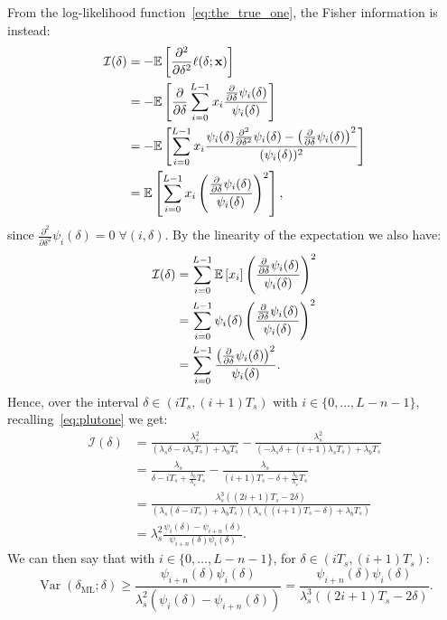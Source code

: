\noindent
From the log-likelihood function~\eqref{eq:the_true_one}, the Fisher information is instead:
\begin{equation}
\begin{aligned}
\mathcal{I}(\delta)
& =-\mathbb{E}\left[{\frac{\partial^2}{\partial \delta^2} \ell(\delta ; \mathbf{x})}\right]\\
& =-\mathbb{E}\left[{\frac{\partial}{\partial \delta} \sum_{i=0}^{L-1} x_i\frac{ \frac{\partial}{\partial \delta}\psi_i(\delta)}{\psi_i(\delta)}}\right]\\
& =-\mathbb{E}\left[{ \sum_{i=0}^{L-1} x_i
\frac{ \psi_i(\delta)\frac{\partial^2}{\partial \delta^2}\psi_i(\delta)
-\left(\frac{\partial}{\partial \delta}\psi_i(\delta)\right)^2}
{(\psi_i(\delta))^2}}\right]\\
& =\mathbb{E}\left[{ \sum_{i=0}^{L-1} x_i
\left(
\frac{\frac{\partial}{\partial \delta}\psi_i(\delta)}{\psi_i(\delta)}
\right)^2}\right],
\end{aligned}
\end{equation}
since \(\frac{\partial^2}{\partial \delta^2}\psi_i(\delta)=0 \;\forall (i,\delta)\). By the linearity of the expectation we also have:
\begin{equation}
\begin{aligned}
\mathcal{I}(\delta)
& = \sum_{i=0}^{L-1} \mathbb{E}\left[{x_i}\right]
\left(
\frac{\frac{\partial}{\partial \delta}\psi_i(\delta)}{\psi_i(\delta)}
\right)^2\\
& = \sum_{i=0}^{L-1} \psi_i(\delta)
\left(
\frac{\frac{\partial}{\partial \delta}\psi_i(\delta)}{\psi_i(\delta)}
\right)^2\\
& = \sum_{i=0}^{L-1}
\frac{\left(\frac{\partial}{\partial \delta}\psi_i(\delta)\right)^2}{\psi_i(\delta)}.
\end{aligned}
\end{equation}
Hence, over the interval \(\delta \in(iT_s,(i+1)T_s)\) with \(i\in\{0, \ldots, L-n-1\}\), recalling~\eqref{eq:plutone} we get:
\begin{equation}
\begin{aligned}
\mathcal{I}(\delta)
&= \frac{\lambda_s^2}{\left(\lambda_s \delta-i \lambda_s T_s\right)+\lambda_b T_s}
-\frac{\lambda_s^2}{\left(-\lambda_s \delta+(i+1) \lambda_s T_s\right)+\lambda_b T_s} \\
&= \frac{\lambda_s}{\delta-i  T_s+\frac{\lambda_b}{\lambda_s} T_s}
- \frac{\lambda_s}{(i+1)T_s-\delta+\frac{\lambda_b}{\lambda_s} T_s}\\
&=\frac{\lambda_s^3\left((2 i+1) T_s-2 \delta\right)}{\left(\lambda_s\left(\delta-i T_s\right)+\lambda_b T_s\right)\left(\lambda_s\left((i+1) T_s-\delta\right)+\lambda_b T_s\right)}\\
&=\lambda_s^2 \frac{\psi_i(\delta)-\psi_{i+n}(\delta)}{\psi_{i+n}(\delta) \psi_i(\delta)}.
\end{aligned}
\label{eq:fisherone}
\end{equation} 
We can then say that with \(i\in\{0, \ldots, L-n-1\}\), for \(\delta \in(iT_s,(i+1)T_s)\):
\begin{equation}
\operatorname{Var}(\delta_{\mathrm{ML}};\delta) \geq 
\frac{\psi_{i+n}(\delta) \psi_i(\delta)}{\lambda_s^2 \left(\psi_i(\delta)-\psi_{i+n}(\delta)\right)}
=\frac{\psi_{i+n}(\delta) \psi_i(\delta)}{\lambda_s^3\left((2 i+1) T_s-2 \delta\right)}.
\end{equation}

